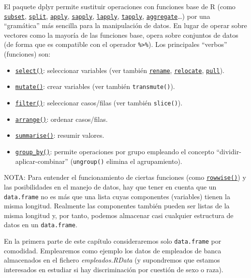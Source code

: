 \documentclass[
]{book}
\begin{document}
El paquete dplyr permite sustituir operaciones con funciones base de R (como \href{NA}{\texttt{subset}}, \href{NA}{\texttt{split}}, \href{NA}{\texttt{apply}}, \href{NA}{\texttt{sapply}}, \href{NA}{\texttt{lapply}}, \href{NA}{\texttt{tapply}}, \href{NA}{\texttt{aggregate}}\ldots) por una ``gramática'' más sencilla para la manipulación de datos.
En lugar de operar sobre vectores como la mayoría de las funciones base,
opera sobre conjuntos de datos (de forma que es compatible con el operador \texttt{\%\textgreater{}\%}).
Los principales ``verbos'' (funciones) son:

\begin{itemize}
\item
  \href{https://dplyr.tidyverse.org/reference/select.html}{\texttt{select()}}: seleccionar variables (ver también \href{https://dplyr.tidyverse.org/reference/rename.html}{\texttt{rename}}, \href{https://dplyr.tidyverse.org/reference/rename.html}{\texttt{relocate}}, \href{https://dplyr.tidyverse.org/reference/rename.html}{\texttt{pull}}).
\item
  \href{https://dplyr.tidyverse.org/reference/mutate.html}{\texttt{mutate()}}: crear variables (ver también \texttt{transmute()}).
\item
  \href{https://dplyr.tidyverse.org/reference/filter.html}{\texttt{filter()}}: seleccionar casos/filas (ver también \texttt{slice()}).
\item
  \href{https://dplyr.tidyverse.org/reference/arrange.html}{\texttt{arrange()}}: ordenar casos/filas.
\item
  \href{https://dplyr.tidyverse.org/reference/summarise.html}{\texttt{summarise()}}: resumir valores.
\item
  \href{https://dplyr.tidyverse.org/reference/group_by.html}{\texttt{group\_by()}}: permite operaciones por grupo empleando el concepto ``dividir-aplicar-combinar'' (\texttt{ungroup()} elimina el agrupamiento).
\end{itemize}

NOTA: Para entender el funcionamiento de ciertas funciones (como \href{https://dplyr.tidyverse.org/reference/rowwise.html}{\texttt{rowwise()}}) y las posibilidades en el manejo de datos, hay que tener en cuenta que un \texttt{data.frame} no es más que una lista cuyas componentes (variables) tienen la misma longitud.
Realmente las componentes también pueden ser listas de la misma longitud y, por tanto, podemos almacenar casi cualquier estructura de datos en un \texttt{data.frame}.

En la primera parte de este capítulo consideraremos solo \texttt{data.frame} por comodidad.
Emplearemos como ejemplo los datos de empleados de banca almacenados en el fichero \emph{empleados.RData} (y supondremos que estamos interesados en estudiar si hay discriminación por cuestión de sexo o raza).
\end{document}
